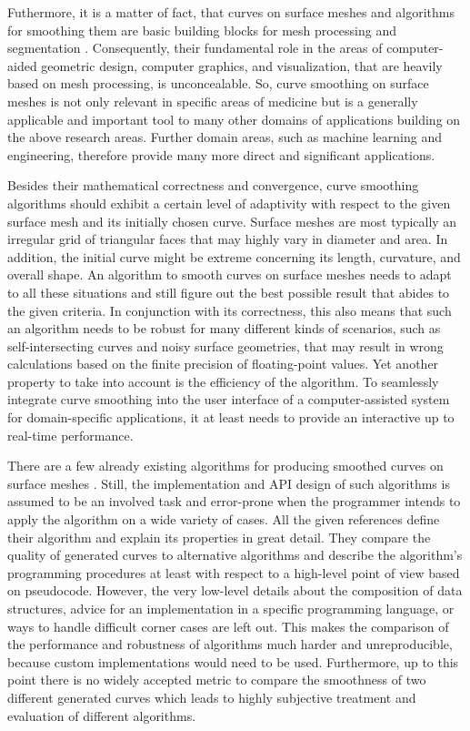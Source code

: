 \documentclass{stdlocal}
\begin{document}
Futhermore, it is a matter of fact, that curves on surface meshes and algorithms for smoothing them are basic building blocks for mesh processing and segmentation \autocite{ji2006,kaplansky2009}.
Consequently, their fundamental role in the areas of computer-aided geometric design, computer graphics, and visualization, that are heavily based on mesh processing, is unconcealable.
So, curve smoothing on surface meshes is not only relevant in specific areas of medicine but is a generally applicable and important tool to many other domains of applications building on the above research areas.
Further domain areas, such as machine learning \autocite{benhabiles2011,park2019} and engineering, therefore provide many more direct and significant applications.

Besides their mathematical correctness and convergence, curve smoothing algorithms should exhibit a certain level of adaptivity with respect to the given surface mesh and its initially chosen curve.
Surface meshes are most typically an irregular grid of triangular faces that may highly vary in diameter and area.
In addition, the initial curve might be extreme concerning its length, curvature, and overall shape.
An algorithm to smooth curves on surface meshes needs to adapt to all these situations and still figure out the best possible result that abides to the given criteria.
In conjunction with its correctness, this also means that such an algorithm needs to be robust for many different kinds of scenarios, such as self-intersecting curves and noisy surface geometries, that may result in wrong calculations based on the finite precision of floating-point values.
Yet another property to take into account is the efficiency of the algorithm.
To seamlessly integrate curve smoothing into the user interface of a computer-assisted system for domain-specific applications, it at least needs to provide an interactive up to real-time performance.
\autocite{lawonn2014}

There are a few already existing algorithms for producing smoothed curves on surface meshes \autocite{hofer2004,martinez2007,lawonn2014,mancinelli2022}.
Still, the implementation and API design of such algorithms is assumed to be an involved task and error-prone when the programmer intends to apply the algorithm on a wide variety of cases.
All the given references define their algorithm and explain its properties in great detail.
They compare the quality of generated curves to alternative algorithms and describe the algorithm's programming procedures at least with respect to a high-level point of view based on pseudocode.
However, the very low-level details about the composition of data structures, advice for an implementation in a specific programming language, or ways to handle difficult corner cases are left out.
This makes the comparison of the performance and robustness of algorithms much harder and unreproducible, because custom implementations would need to be used.
Furthermore, up to this point there is no widely accepted metric to compare the smoothness of two different generated curves which leads to highly subjective treatment and evaluation of different algorithms.
\end{document}
